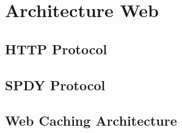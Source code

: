 \section{Architecture Web}

\subsection{HTTP Protocol}

\subsection{SPDY Protocol}

\subsection{Web Caching Architecture}

\newpage
